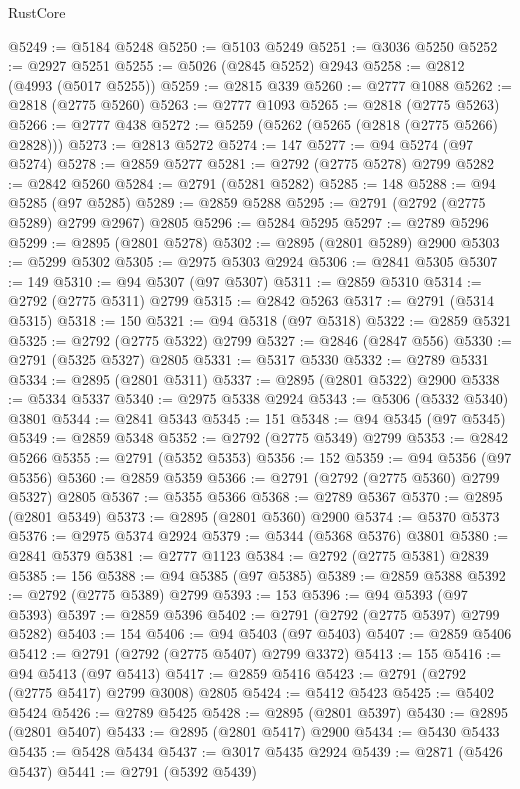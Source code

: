 \begin{lexlean}{RustCore}
\begin{coremodule}
@5249 := @5184 @5248
@5250 := @5103 @5249
@5251 := @3036 @5250
@5252 := @2927 @5251
@5255 := @5026 (@2845 @5252) @2943
@5258 := @2812 (@4993 (@5017 @5255))
@5259 := @2815 @339
@5260 := @2777 @1088
@5262 := @2818 (@2775 @5260)
@5263 := @2777 @1093
@5265 := @2818 (@2775 @5263)
@5266 := @2777 @438
@5272 := @5259 (@5262 (@5265 (@2818 (@2775 @5266) @2828)))
@5273 := @2813 @5272
@5274 := 147
@5277 := @94 @5274 (@97 @5274)
@5278 := @2859 @5277
@5281 := @2792 (@2775 @5278) @2799
@5282 := @2842 @5260
@5284 := @2791 (@5281 @5282)
@5285 := 148
@5288 := @94 @5285 (@97 @5285)
@5289 := @2859 @5288
@5295 := @2791 (@2792 (@2775 @5289) @2799 @2967) @2805
@5296 := @5284 @5295
@5297 := @2789 @5296
@5299 := @2895 (@2801 @5278)
@5302 := @2895 (@2801 @5289) @2900
@5303 := @5299 @5302
@5305 := @2975 @5303 @2924
@5306 := @2841 @5305
@5307 := 149
@5310 := @94 @5307 (@97 @5307)
@5311 := @2859 @5310
@5314 := @2792 (@2775 @5311) @2799
@5315 := @2842 @5263
@5317 := @2791 (@5314 @5315)
@5318 := 150
@5321 := @94 @5318 (@97 @5318)
@5322 := @2859 @5321
@5325 := @2792 (@2775 @5322) @2799
@5327 := @2846 (@2847 @556)
@5330 := @2791 (@5325 @5327) @2805
@5331 := @5317 @5330
@5332 := @2789 @5331
@5334 := @2895 (@2801 @5311)
@5337 := @2895 (@2801 @5322) @2900
@5338 := @5334 @5337
@5340 := @2975 @5338 @2924
@5343 := @5306 (@5332 @5340) @3801
@5344 := @2841 @5343
@5345 := 151
@5348 := @94 @5345 (@97 @5345)
@5349 := @2859 @5348
@5352 := @2792 (@2775 @5349) @2799
@5353 := @2842 @5266
@5355 := @2791 (@5352 @5353)
@5356 := 152
@5359 := @94 @5356 (@97 @5356)
@5360 := @2859 @5359
@5366 := @2791 (@2792 (@2775 @5360) @2799 @5327) @2805
@5367 := @5355 @5366
@5368 := @2789 @5367
@5370 := @2895 (@2801 @5349)
@5373 := @2895 (@2801 @5360) @2900
@5374 := @5370 @5373
@5376 := @2975 @5374 @2924
@5379 := @5344 (@5368 @5376) @3801
@5380 := @2841 @5379
@5381 := @2777 @1123
@5384 := @2792 (@2775 @5381) @2839
@5385 := 156
@5388 := @94 @5385 (@97 @5385)
@5389 := @2859 @5388
@5392 := @2792 (@2775 @5389) @2799
@5393 := 153
@5396 := @94 @5393 (@97 @5393)
@5397 := @2859 @5396
@5402 := @2791 (@2792 (@2775 @5397) @2799 @5282)
@5403 := 154
@5406 := @94 @5403 (@97 @5403)
@5407 := @2859 @5406
@5412 := @2791 (@2792 (@2775 @5407) @2799 @3372)
@5413 := 155
@5416 := @94 @5413 (@97 @5413)
@5417 := @2859 @5416
@5423 := @2791 (@2792 (@2775 @5417) @2799 @3008) @2805
@5424 := @5412 @5423
@5425 := @5402 @5424
@5426 := @2789 @5425
@5428 := @2895 (@2801 @5397)
@5430 := @2895 (@2801 @5407)
@5433 := @2895 (@2801 @5417) @2900
@5434 := @5430 @5433
@5435 := @5428 @5434
@5437 := @3017 @5435 @2924
@5439 := @2871 (@5426 @5437)
@5441 := @2791 (@5392 @5439)

\end{coremodule}
\end{lexlean}
